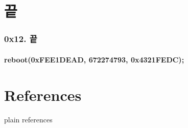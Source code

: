 \section[Section]{끝}


\begin{frame}
  \frametitle{0x12. 끝}
  \framesubtitle{reboot(0xFEE1DEAD, 672274793, 0x4321FEDC);}

\end{frame}

\usebackgroundtemplate{}

\section[Section]{References}
 {plain}
 {references}


